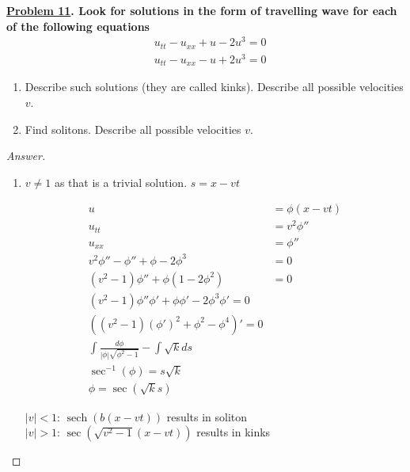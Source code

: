 \documentclass{article}
\theoremstyle{definition}
\renewcommand\qedsymbol{$\blacksquare$}
\newenvironment{ans}{\begin{proof}[Answer]\renewcommand{\qedsymbol}{}}{\end{proof}}
\newenvironment{boldenv}{\bfseries\boldmath}{}
\DeclareMathOperator{\sech}{sech}
\begin{document}
\begin{boldenv}
    \underline{Problem 11}. Look for solutions in the form of travelling wave for each of the following equations
    \begin{align*}
        & u_{tt} - u_{xx} + u - 2u^3 = 0\\
        & u_{tt} - u_{xx} - u + 2u^3 = 0
    \end{align*} \begin{enumerate}
        \item Describe such solutions (they are called kinks). Describe all possible velocities $v$.
        \item Find solitons. Describe all possible velocities $v$.
    \end{enumerate}
\end{boldenv}
\begin{ans}
\begin{enumerate}
    \item $v \neq 1$ as that is a trivial solution.
    $s = x - vt$

	\begin{align*}
		u &= \phi(x-vt)\\
		u_{tt} &= v^2 \phi''\\
		u_{xx} &= \phi''\\
		v^2 \phi'' - \phi'' + \phi - 2\phi^3 &= 0\\
		(v^2 -1) \phi'' + \phi(1-2\phi^2) &= 0\\
		(v^2 -1) \phi'' \phi' + \phi \phi' - 2 \phi^3 \phi' = 0\\
		((v^2 - 1)(\phi')^2 + \phi^2 - \phi^4)' = 0\\
		\int \frac{d\phi}{|\phi|\sqrt{\phi^2 -1}} - \int \sqrt{k} ds\\
		\sec^{-1} (\phi) = s\sqrt{k}\\
		\phi = \sec(\sqrt{k} s)
	\end{align*}

$|v| < 1$: $\sech(b(x-vt))$ results in soliton\\
$|v| > 1$: $\sec(\sqrt{v^2 - 1} (x-vt))$ results in kinks


\end{enumerate}
\end{ans}
\end{document}
